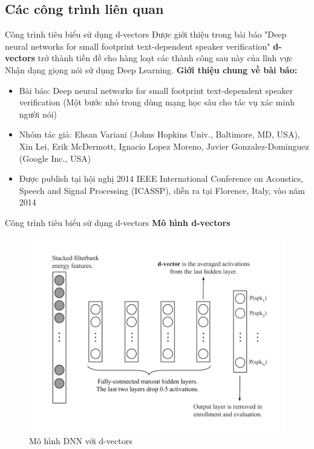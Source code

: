 \documentclass[notheorems, aspectratio=54]{beamer}
\begin{document}
\subsection{Các công trình liên quan}
\begin{frame}{Công trình tiêu biểu sử dụng d-vectors}
	Được giới thiệu trong bài báo "Deep neural networks for small footprint text-dependent speaker verification" \textbf{d-vectors} trở thành tiền đề cho hàng loạt các thành công sau này của lĩnh vực Nhận dạng giọng nói sử dụng Deep Learning.
	\textbf{Giới thiệu chung về bài báo:}
	\begin{itemize}
		\item Bài báo: Deep neural networks for small footprint text-dependent speaker verification (Một bước nhỏ trong dùng mạng học sâu cho tác vụ xác minh người nói)
		\item Nhóm tác giả: Ehsan Variani (Johns Hopkins Univ., Baltimore, MD, USA), Xin Lei, Erik McDermott, Ignacio Lopez Moreno, Javier Gonzalez-Dominguez (Google Inc., USA)
		\item Được publish tại hội nghị 2014 IEEE International Conference on Acoustics, Speech and Signal Processing (ICASSP), diễn ra tại Florence, Italy, vào năm 2014
	\end{itemize}
\end{frame}
\begin{frame}{Công trình tiêu biểu sử dụng d-vectors}
	\textbf{Mô hình d-vectors}
	\begin{figure}[H]
		\includegraphics[width=0.7\linewidth]{images/d-vectors.png}
		\caption{Mô hình DNN với d-vectors}
		\label{fig:writing-thesis}
	\end{figure}
\end{frame}
\end{document}
